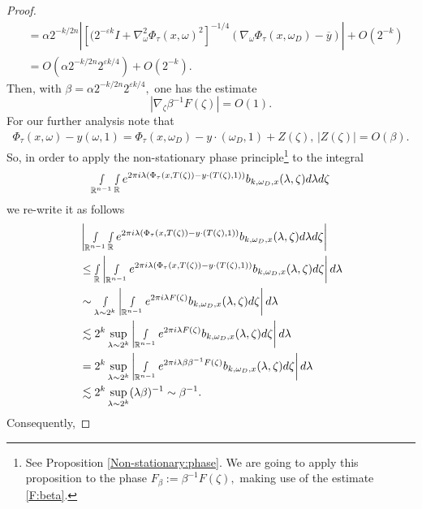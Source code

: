 \documentclass[12pt, reqno]{amsart}
\theoremstyle{definition}
\theoremstyle{remark}
\numberwithin{equation}{section}
\begin{document}
\begin{proof}
\begin{align*}
    &= \alpha 2^{-k/2n}|[(2^{-\varepsilon k}I+\nabla_{\omega}^2\Phi_\tau(x,\omega)^2]^{-1/4}(\nabla_\omega \Phi_\tau(x,\omega_D)-\overline{y})|+O(2^{-k})\\
    &=O(\alpha 2^{-k/2n}2^{\varepsilon k/4})+O(2^{-k}).
\end{align*}Then, with $\beta=\alpha 2^{-k/2n}2^{\varepsilon k/4},$ one has the estimate
\begin{equation}\label{F:beta}
    |\nabla_{\zeta}\beta^{-1}F(\zeta)|=O(1) . 
\end{equation}
For our further analysis note that 
\begin{align*}
      \Phi_\tau(x,\omega)-y(\omega,1) = \Phi_\tau(x,\omega_D)-y\cdot(\omega_D,1)+Z(\zeta),\, |Z(\zeta)|=O(\beta). 
\end{align*}
So, in order to apply the non-stationary phase principle\footnote{See Proposition \ref{Non-stationary:phase}. We are going to apply this proposition to the phase $F_\beta:=\beta^{-1}F(\zeta),$ making use of the estimate \eqref{F:beta}.}
to the integral
$$ \smallint\limits_{\mathbb{R}^{n-1}}  \smallint\limits_{\mathbb{R}} e^{2\pi i\lambda(\Phi_\tau(x,T(\zeta))-y\cdot (T(\zeta),1) ) } b_{k,\omega_D,x}(\lambda,\zeta)  d\lambda d\zeta$$
we re-write it as follows
\begin{align*}
    &\left|  \smallint\limits_{\mathbb{R}^{n-1}}  \smallint\limits_{\mathbb{R}} e^{2\pi i\lambda(\Phi_\tau(x,T(\zeta))-y\cdot (T(\zeta),1) ) } b_{k,\omega_D,x}(\lambda,\zeta) d\lambda d\zeta  \right|\\
    &\leq   \smallint\limits_{\mathbb{R}}\left|  \smallint\limits_{\mathbb{R}^{n-1}}   e^{2\pi i\lambda(\Phi_\tau(x,T(\zeta))-y\cdot (T(\zeta),1) ) } b_{k,\omega_D,x}(\lambda,\zeta)   d\zeta  \right| d\lambda\\
    &\sim   \smallint\limits_{\lambda\sim 2^{k}}\left|  \smallint\limits_{\mathbb{R}^{n-1}}   e^{2\pi i\lambda F(\zeta) } b_{k,\omega_D,x}(\lambda,\zeta)   d\zeta  \right| d\lambda\\
    &\lesssim 2^{k}\sup_{\lambda\sim 2^k}  \left|  \smallint\limits_{\mathbb{R}^{n-1}}   e^{2\pi i\lambda F(\zeta) } b_{k,\omega_D,x}(\lambda,\zeta)   d\zeta  \right| d\lambda\\
    &= 2^{k}\sup_{\lambda\sim 2^k}  \left|  \smallint\limits_{\mathbb{R}^{n-1}}   e^{2\pi i\lambda\beta \beta^{-1}F(\zeta) } b_{k,\omega_D,x}(\lambda,\zeta)  d\zeta  \right| d\lambda\\
    &\lesssim 2^{k}\sup_{\lambda\sim 2^k} (\lambda\beta)^{-1}\sim \beta^{-1}.
\end{align*} Consequently,

\end{proof}
\end{document}
